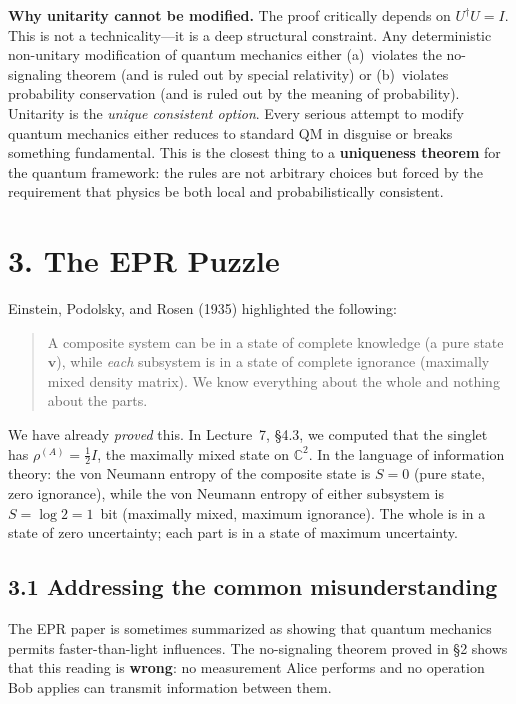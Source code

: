 \documentclass[12pt,a4paper]{article}
\begin{document}
\medskip
\noindent\textbf{Why unitarity cannot be modified.}  The proof critically depends on $U^\dagger U = I$.  This is not a technicality---it is a deep structural constraint.  Any deterministic non-unitary modification of quantum mechanics either (a)~violates the no-signaling theorem (and is ruled out by special relativity) or (b)~violates probability conservation (and is ruled out by the meaning of probability).  Unitarity is the \emph{unique consistent option}.  Every serious attempt to modify quantum mechanics either reduces to standard QM in disguise or breaks something fundamental.  This is the closest thing to a \textbf{uniqueness theorem} for the quantum framework: the rules are not arbitrary choices but forced by the requirement that physics be both local and probabilistically consistent.

\section{3. The EPR Puzzle}

Einstein, Podolsky, and Rosen (1935) highlighted the following:

\begin{quote}
A composite system can be in a state of complete knowledge (a pure state $\mathbf{v}$), while \emph{each} subsystem is in a state of complete ignorance (maximally mixed density matrix).  We know everything about the whole and nothing about the parts.
\end{quote}

\noindent We have already \emph{proved} this.  In Lecture~7, \S4.3, we computed that the singlet has $\rho^{(A)} = \frac{1}{2}I$, the maximally mixed state on $\mathbb{C}^2$.  In the language of information theory: the von Neumann entropy of the composite state is $S=0$ (pure state, zero ignorance), while the von Neumann entropy of either subsystem is $S=\log 2 = 1$~bit (maximally mixed, maximum ignorance).  The whole is in a state of zero uncertainty; each part is in a state of maximum uncertainty.

\subsection{3.1 Addressing the common misunderstanding}
The EPR paper is sometimes summarized as showing that quantum mechanics permits faster-than-light influences.  The no-signaling theorem proved in \S2 shows that this reading is \textbf{wrong}: no measurement Alice performs and no operation Bob applies can transmit information between them.
\end{document}
